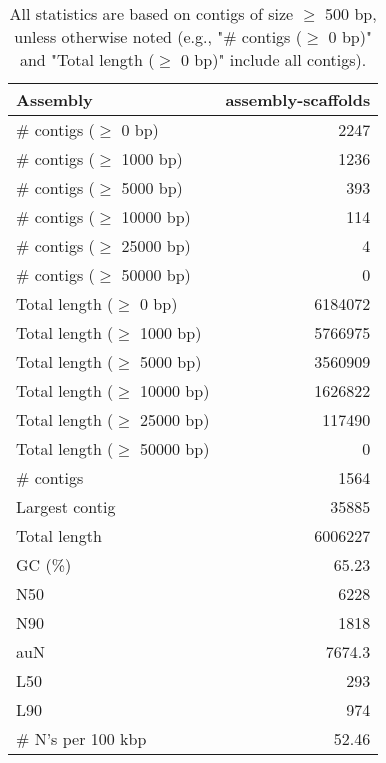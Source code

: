 \documentclass[12pt,a4paper]{article}
\begin{document}
\begin{table}[ht]
\begin{center}
\caption{All statistics are based on contigs of size $\geq$ 500 bp, unless otherwise noted (e.g., "\# contigs ($\geq$ 0 bp)" and "Total length ($\geq$ 0 bp)" include all contigs).}
\begin{tabular}{|l*{1}{|r}|}
\hline
Assembly & assembly-scaffolds \\ \hline
\# contigs ($\geq$ 0 bp) & 2247 \\ \hline
\# contigs ($\geq$ 1000 bp) & 1236 \\ \hline
\# contigs ($\geq$ 5000 bp) & 393 \\ \hline
\# contigs ($\geq$ 10000 bp) & 114 \\ \hline
\# contigs ($\geq$ 25000 bp) & 4 \\ \hline
\# contigs ($\geq$ 50000 bp) & 0 \\ \hline
Total length ($\geq$ 0 bp) & 6184072 \\ \hline
Total length ($\geq$ 1000 bp) & 5766975 \\ \hline
Total length ($\geq$ 5000 bp) & 3560909 \\ \hline
Total length ($\geq$ 10000 bp) & 1626822 \\ \hline
Total length ($\geq$ 25000 bp) & 117490 \\ \hline
Total length ($\geq$ 50000 bp) & 0 \\ \hline
\# contigs & 1564 \\ \hline
Largest contig & 35885 \\ \hline
Total length & 6006227 \\ \hline
GC (\%) & 65.23 \\ \hline
N50 & 6228 \\ \hline
N90 & 1818 \\ \hline
auN & 7674.3 \\ \hline
L50 & 293 \\ \hline
L90 & 974 \\ \hline
\# N's per 100 kbp & 52.46 \\ \hline
\end{tabular}
\end{center}
\end{table}
\end{document}
